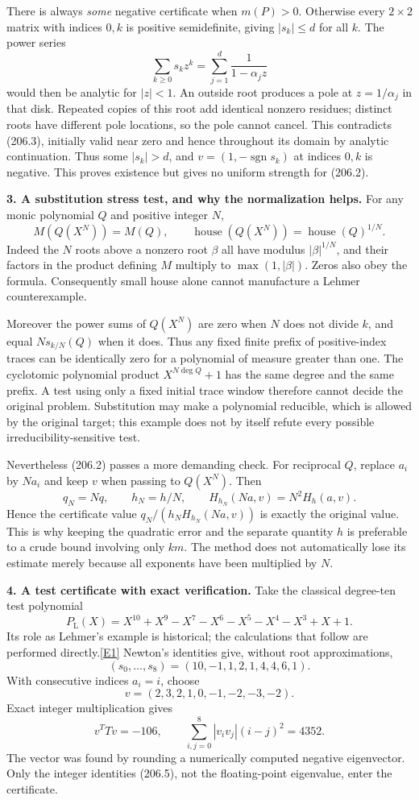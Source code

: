 \documentclass[11pt,a4paper]{article}
\newcommand{\eref}[2]{\hyperlink{extra:#1:#2}{[E#2]}}
\begin{document}
There is always \emph{some} negative certificate when $m(P)>0$.
Otherwise every $2\times2$ matrix with indices $0,k$ is positive
semidefinite, giving $|s_k|\le d$ for all $k$. The power series
\[
 \sum_{k\ge0}s_kz^k=\sum_{j=1}^d\frac{1}{1-\alpha_jz}
 \tag{206.3}
\]
would then be analytic for $|z|<1$. An outside root produces a pole
at $z=1/\alpha_j$ in that disk. Repeated copies of this root add
identical nonzero residues; distinct roots have different pole locations,
so the pole cannot cancel. This contradicts (206.3), initially valid
near zero and hence throughout its domain by analytic continuation.
Thus some $|s_k|>d$, and $v=(1,-\operatorname{sgn}s_k)$ at indices
$0,k$ is negative. This proves existence but gives no uniform strength
for (206.2).

\textbf{3. A substitution stress test, and why the normalization helps.}
For any monic polynomial $Q$ and positive integer $N$,
\[
 M(Q(X^N))=M(Q),\qquad
 \operatorname{house}(Q(X^N))=
 \operatorname{house}(Q)^{1/N}. \tag{206.4}
\]
Indeed the $N$ roots above a nonzero root $\beta$ all have modulus
$|\beta|^{1/N}$, and their factors in the product defining $M$ multiply
to $\max(1,|\beta|)$. Zeros also obey the formula. Consequently small
house alone cannot manufacture a Lehmer counterexample.

Moreover the power sums of $Q(X^N)$ are zero when $N$ does not divide
$k$, and equal $N s_{k/N}(Q)$ when it does. Thus any fixed finite prefix
of positive-index traces can be identically zero for a polynomial of
measure greater than one. The cyclotomic polynomial product
$X^{N\deg Q}+1$ has the same degree and the same prefix. A test using
only a fixed initial trace window therefore cannot decide the original
problem. Substitution may make a polynomial reducible, which is allowed
by the original target; this example does not by itself refute every
possible irreducibility-sensitive test.

Nevertheless (206.2) passes a more demanding check. For reciprocal $Q$,
replace $a_i$ by $Na_i$ and keep $v$ when passing to $Q(X^N)$. Then
\[
 q_N=Nq,\qquad h_N=h/N,\qquad
 H_{h_N}(Na,v)=N^2H_h(a,v).
\]
Hence the certificate value $q_N/(h_NH_{h_N}(Na,v))$ is exactly the
original value. This is why keeping the quadratic error and the separate
quantity $h$ is preferable to a crude bound involving only $km$.
The method does not automatically lose its estimate merely because
all exponents have been multiplied by $N$.

\textbf{4. A test certificate with exact verification.}
Take the classical degree-ten test polynomial
\[
 P_\mathrm L(X)=X^{10}+X^9-X^7-X^6-X^5-X^4-X^3+X+1.
\]
Its role as Lehmer's example is historical; the calculations that follow
are performed directly.\eref{206}{1}
Newton's identities give, without root approximations,
\[
 (s_0,\ldots,s_8)=(10,-1,1,2,1,4,4,6,1).
\]
With consecutive indices $a_i=i$, choose
\[
 v=(2,3,2,1,0,-1,-2,-3,-2).
\]
Exact integer multiplication gives
\[
 v^TTv=-106,\qquad
 \sum_{i,j=0}^8|v_iv_j|(i-j)^2=4352. \tag{206.5}
\]
The vector was found by rounding a numerically computed negative
eigenvector. Only the integer identities (206.5), not the floating-point
eigenvalue, enter the certificate.
\end{document}
